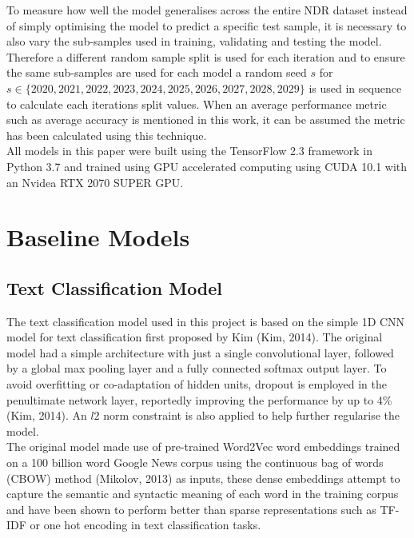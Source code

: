 \documentclass[a4paper,12pt]{article}
\begin{document}
To measure how well the model generalises across the entire NDR dataset instead of simply optimising the model to predict a specific test sample, it is necessary to also vary the sub-samples used in training, validating and testing the model. Therefore a different random sample split is used for each iteration and to ensure the same sub-samples are used for each model a random seed $s$ for $s \in \{2020, 2021, 2022, 2023, 2024, 2025, 2026, 2027, 2028, 2029\}$ is used in sequence to calculate each iterations split values. When an average performance metric such as average accuracy is mentioned in this work, it can be assumed the metric has been calculated using this technique.\\

All models in this paper were built using the TensorFlow 2.3 framework in Python 3.7 and trained using GPU accelerated computing using CUDA 10.1 with an Nvidea RTX 2070 SUPER GPU.

\section{Baseline Models}

\subsection{Text Classification Model}
The text classification model used in this project is based on the simple 1D CNN model for text classification first proposed by Kim (Kim, 2014). The original model had a simple architecture with just a single convolutional layer, followed by a global max pooling layer and a fully connected softmax output layer. To avoid overfitting or co-adaptation of hidden units, dropout is employed in the penultimate network layer, reportedly improving the performance by up to 4\% (Kim, 2014). An $l2$ norm constraint is also applied to help further regularise the model.\\

The original model made use of pre-trained Word2Vec word embeddings trained on a 100 billion word Google News corpus using the continuous bag of words (CBOW) method (Mikolov, 2013) as inputs, these dense embeddings attempt to capture the semantic and syntactic meaning of each word in the training corpus and have been shown to perform better than sparse representations such as TF-IDF or one hot encoding in text classification tasks.\\
\end{document}

